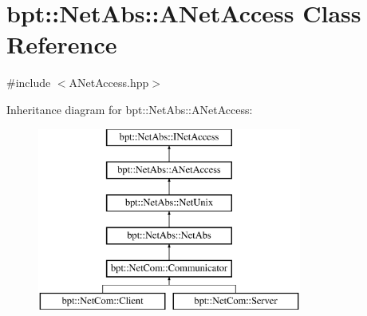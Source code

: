 \hypertarget{classbpt_1_1_net_abs_1_1_a_net_access}{\section{bpt\-:\-:Net\-Abs\-:\-:A\-Net\-Access Class Reference}
\label{classbpt_1_1_net_abs_1_1_a_net_access}
}


{\ttfamily \#include $<$A\-Net\-Access.\-hpp$>$}

Inheritance diagram for bpt\-:\-:Net\-Abs\-:\-:A\-Net\-Access\-:\begin{figure}[H]
\begin{center}
\leavevmode
\includegraphics[height=6.000000cm]{classbpt_1_1_net_abs_1_1_a_net_access}
\end{center}
\end{figure}
